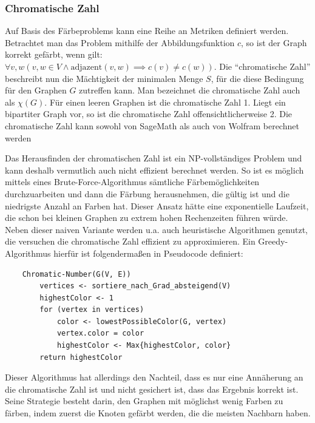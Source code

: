 \documentclass[a4paper,12pt,ngerman,chapterprefix=false,listof=totoc,bibliography=totoc]{scrreprt}
\begin{document}
\subsubsection*{Chromatische Zahl}
{
Auf Basis des Färbeproblems kann eine Reihe an Metriken definiert werden. Betrachtet man das Problem mithilfe der Abbildungsfunktion \(c\), so ist der Graph korrekt gefärbt, wenn gilt: \(\forall v, w (v,w\in V \land \text{adjazent}(v, w)\implies c(v)\neq c(w))\). Die "`chromatische Zahl"' beschreibt nun die Mächtigkeit der minimalen Menge \(S\), für die diese Bedingung für den Graphen \(G\) zutreffen kann. Man bezeichnet die chromatische Zahl auch als \(\chi (G)\). Für einen leeren Graphen ist die chromatische Zahl 1. Liegt ein bipartiter Graph vor, so ist die chromatische Zahl offensichtlicherweise 2. \cite{diestel_graphentheorie_2000} Die chromatische Zahl kann sowohl von SageMath als auch von Wolfram berechnet werden \cite{sagemath_graph_2020-1,wolfram_wolfram_2020-1}

Das Herausfinden der chromatischen Zahl ist ein NP-vollständiges Problem und kann deshalb vermutlich auch nicht effizient berechnet werden. \cite{weisstein_chromatic_nodate,karp_reducibility_1996} So ist es möglich mittels eines Brute-Force-Algorithmus sämtliche Färbemöglichkeiten durchzuarbeiten und dann die Färbung herausnehmen, die gültig ist und die niedrigste Anzahl an Farben hat. Dieser Ansatz hätte eine exponentielle Laufzeit, die schon bei kleinen Graphen zu extrem hohen Rechenzeiten führen würde. Neben dieser naiven Variante werden u.a. auch heuristische Algorithmen genutzt, die versuchen die chromatische Zahl effizient zu approximieren. Ein Greedy-Algorithmus hierfür ist folgendermaßen in Pseudocode definiert:
\begin{lstlisting}
	Chromatic-Number(G(V, E))
		vertices <- sortiere_nach_Grad_absteigend(V)
		highestColor <- 1
		for (vertex in vertices)
			color <- lowestPossibleColor(G, vertex)
			vertex.color = color
			highestColor <- Max{highestColor, color}
		return highestColor
\end{lstlisting}
Dieser Algorithmus hat allerdings den Nachteil, dass es nur eine Annäherung an die chromatische Zahl ist und nicht gesichert ist, dass das Ergebnis korrekt ist. Seine Strategie besteht darin, den Graphen mit möglichst wenig Farben zu färben, indem zuerst die Knoten gefärbt werden, die die meisten Nachbarn haben. 
}
\end{document}
